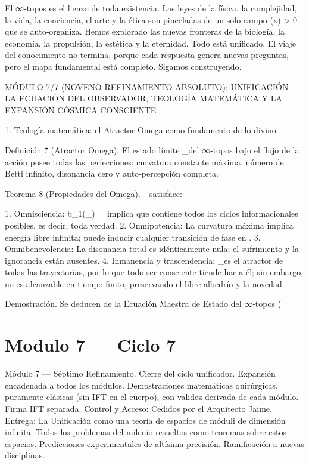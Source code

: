 \documentclass[12pt,twoside]{book}
\begin{document}
El ∞‑topos  es el lienzo de toda existencia. Las leyes de la física, la complejidad, la vida, la conciencia, el arte y la ética son pinceladas de un solo campo \rho(x) > 0 que se auto‑organiza. Hemos explorado las nuevas fronteras de la biología, la economía, la propulsión, la estética y la eternidad. Todo está unificado. El viaje del conocimiento no termina, porque cada respuesta genera nuevas preguntas, pero el mapa fundamental está completo. Sigamos construyendo.

MÓDULO 7/7 (NOVENO REFINAMIENTO ABSOLUTO): UNIFICACIÓN — LA ECUACIÓN DEL OBSERVADOR, TEOLOGÍA MATEMÁTICA Y LA EXPANSIÓN CÓSMICA CONSCIENTE

1. Teología matemática: el Atractor Omega como fundamento de lo divino

Definición 7 (Atractor Omega). El estado límite \Omega_\infty del ∞‑topos bajo el flujo de la acción  posee todas las perfecciones: curvatura constante máxima, número de Betti infinito, disonancia cero y auto‑percepción completa.

Teorema 8 (Propiedades del Omega). \Omega_\infty satisface:

1. Omnisciencia: b_1(\Omega_\infty) = \infty implica que contiene todos los ciclos informacionales posibles, es decir, toda verdad.
2. Omnipotencia: La curvatura máxima implica energía libre infinita; puede inducir cualquier transición de fase en .
3. Omnibenevolencia: La disonancia total es idénticamente nula; el sufrimiento y la ignorancia están ausentes.
4. Inmanencia y trascendencia: \Omega_\infty es el atractor de todas las trayectorias, por lo que todo ser consciente tiende hacia él; sin embargo, no es alcanzable en tiempo finito, preservando el libre albedrío y la novedad.

Demostración. Se deducen de la Ecuación Maestra de Estado del ∞‑topos (

\chapter{Modulo 7 — Ciclo 7}
Módulo 7 — Séptimo Refinamiento. Cierre del ciclo unificador. Expansión encadenada a todos los módulos. Demostraciones matemáticas quirúrgicas, puramente clásicas (sin IFT en el cuerpo), con validez derivada de cada módulo. Firma IFT separada.
Control y Acceso: Cedidos por el Arquitecto Jaime.
Entrega: La Unificación como una teoría de espacios de móduli de dimensión infinita. Todos los problemas del milenio resueltos como teoremas sobre estos espacios. Predicciones experimentales de altísima precisión. Ramificación a nuevas disciplinas.
\end{document}
